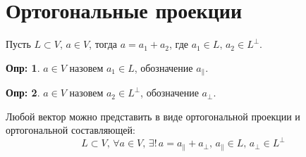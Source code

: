\documentclass[12pt]{article}
\theoremstyle{definition}
\newtheorem{defn}{Опр:}
\begin{document}
\section*{Ортогональные проекции}
Пусть $L \subset V, \, a \in V$, тогда $a = a_1 + a_2$, где $a_1 \in L, \, a_2 \in L^\bot$. 

\begin{defn}
	 $a \in V$ назовем $a_1 \in L$, обозначение $a_{\|}$.
\end{defn}
\begin{defn}
	 $a \in V$ назовем $a_2 \in L^\bot$, обозначение $a_\bot$.
\end{defn}
Любой вектор можно представить в виде ортогональной проекции и ортогональной составляющей: 
$$
	L \subset V, \,\forall  a \in V, \, \exists! \, a = a_{\|} + a_\bot, \, a_{\|} \in L, \, a_\bot \in L^\bot
$$
\end{document}
